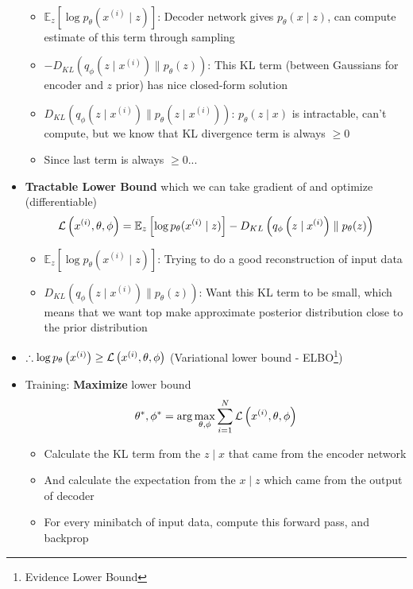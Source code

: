 \begin{itemize}
$$\begin{aligned}
	\end{aligned}$$
	\begin{itemize}
		\item $\mathbb{E}_{z}\left[\log p_\theta(x^{(i)} \mid z)\right]$: Decoder network gives $p_\theta(x\mid z)$, can compute estimate of this term through sampling
		\item $- D_{KL}\left(q_\phi\left(z\mid x^{(i)}\right) \parallel p_\theta(z) \right)$: This KL term (between Gaussians for encoder and $z$ prior) has nice closed-form solution
		\item $D_{KL}\left(q_\phi\left(z\mid x^{(i)}\right) \parallel p_\theta\left(z\mid x^{(i)}\right)\right)$: $p_\theta(z\mid x)$ is intractable, can't compute, but we know that KL divergence term is always $\geq 0$
		\item Since last term is always $\geq 0$...
	\end{itemize}
	\item \textbf{Tractable Lower Bound} which we can take gradient of and optimize (differentiable)
	$$\mathcal{L}\left(x^{(i)}, \theta, \phi \right) =\mathbb{E}_{z}\left[\log p_\theta(x^{(i)} \mid z)\right] - D_{KL}\left(q_\phi\left(z\mid x^{(i)}\right) \parallel p_\theta(z) \right) $$
	\begin{itemize}
		\item $\mathbb{E}_{z}\left[\log p_\theta(x^{(i)} \mid z)\right]$: Trying to do a good reconstruction of input data
		\item $D_{KL}\left(q_\phi\left(z\mid x^{(i)}\right) \parallel p_\theta(z) \right)$: Want this KL term to be small, which means that we want top make approximate posterior distribution close to the prior distribution 
	\end{itemize}
	\item $\therefore \log p_\theta\left(x^{(i)}\right) \geq \mathcal{L}\left(x^{(i)}, \theta, \phi \right)$ (Variational lower bound - ELBO\footnote{Evidence Lower Bound})
	\item Training: \textbf{Maximize} lower bound
	$$\displaystyle \theta^\ast, \phi^\ast = \arg\max_{\theta, \phi} \sum_{i=1}^N \mathcal{L}\left(x^{(i)}, \theta, \phi \right)$$
	\begin{itemize}
		\item Calculate the KL term from the $z\mid x$ that came from the encoder network
		\item And calculate the expectation from the $x\mid z$ which came from the output of decoder
		\item For every minibatch of input data, compute this forward pass, and backprop

\end{itemize}
\end{itemize}
